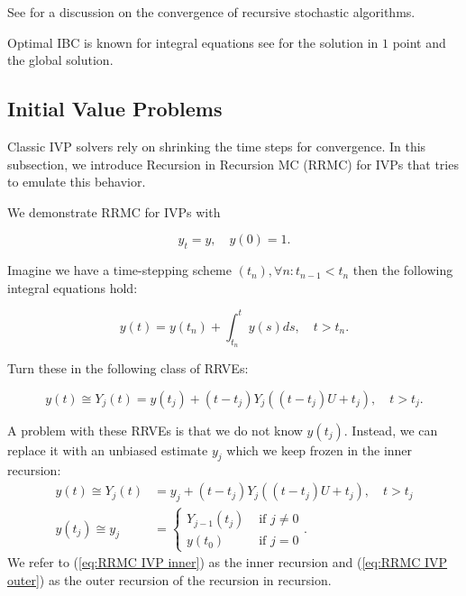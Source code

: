 \documentclass[a4paper,12pt]{article}
\begin{document}
\begin{related}
    See \cite{gupta_convergence_2021} for a discussion on the convergence
    of recursive stochastic algorithms.
\end{related}


\begin{related}
    Optimal IBC is known for integral equations see \cite{heinrich_monte_nodate}
    for the solution in $1$ point and the global solution.
\end{related}

\subsection{Initial Value Problems}
Classic IVP solvers rely on shrinking the time steps for
convergence. In this subsection, we introduce
Recursion in Recursion MC (RRMC) for IVPs that tries to emulate
this behavior.


\begin{example}[RRMC $y_t=y$] \label{ex:RRMC IVP}
    We demonstrate RRMC for IVPs with

    \begin{equation}
        y_t = y, \quad y(0) = 1.
    \end{equation}

    Imagine we have a time-stepping scheme $(t_{n}), \forall n: t_{n-1} < t_{n}$
    then the following integral equations hold:

    \begin{equation}
        y(t)= y(t_{n}) + \int_{t_{n}}^{t}y(s)ds , \quad t>t_{n}.
    \end{equation}

    Turn these in the following class of RRVEs:

    \begin{equation}
        y(t) \cong Y_{j}(t) = y(t_{j}) + (t-t_{j})Y_{j}((t-t_{j})U+t_{j}), \quad t>t_{j}.
    \end{equation}

    A problem with these RRVEs is that we do not know $y(t_{j})$.
    Instead, we can replace it with an unbiased estimate $y_{j}$
    which we keep frozen in the inner recursion:
    \begin{align}
        \label{eq:RRMC IVP inner}
        y(t) \cong Y_{j}(t)  & = y_{j} + (t-t_{j})Y_{j}((t-t_{j})U+t_{j}), \quad t>t_{j} \\
        y(t_{j}) \cong y_{j} & = \begin{cases}
                                     Y_{j-1}(t_{j}) & \text{ if } j \neq 0 \\
                                     y(t_{0})       & \text{ if } j = 0
                                 \end{cases}.
        \label{eq:RRMC IVP outer}
    \end{align}
    We refer to (\ref{eq:RRMC IVP inner}) as the inner recursion and
    (\ref{eq:RRMC IVP outer}) as the outer recursion of the recursion in
    recursion.
\end{example}
\end{document}
